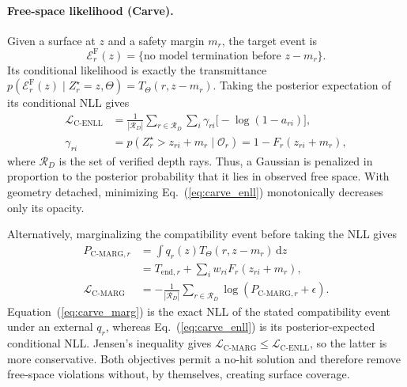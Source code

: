 \paragraph{Free-space likelihood (Carve).}
Given a surface at $z$ and a safety margin $m_r$, the target event is
\begin{equation}\label{eq:carve_event}
  \mathcal E_r^{\mathrm F}(z)
  =\{\text{no model termination before }z-m_r\}.
\end{equation}
Its conditional likelihood is exactly the transmittance
$p(\mathcal E_r^{\mathrm F}(z)\mid Z_r^\star=z,\Theta)
=T_\Theta(r,z-m_r)$. Taking the posterior expectation of its conditional NLL
gives
\begin{align}
  \mathcal L_{\mathrm{C\text{-}ENLL}}
  &=\frac{1}{|\mathcal R_D|}\sum_{r\in\mathcal R_D}\sum_i
    \gamma_{ri}\big[-\log(1-a_{ri})\big], \label{eq:carve_enll}\\
  \gamma_{ri}
  &=p(Z_r^\star>z_{ri}+m_r\mid\mathcal O_r)
    =1-F_r(z_{ri}+m_r), \nonumber
\end{align}
where $\mathcal R_D$ is the set of verified depth rays. Thus, a Gaussian is
penalized in proportion to the posterior probability that it lies in observed
free space. With geometry detached, minimizing Eq.~(\ref{eq:carve_enll})
monotonically decreases only its opacity.

Alternatively, marginalizing the compatibility event before taking the NLL
gives
\begin{align}
  P_{\mathrm{C\text{-}MARG},r}
  &=\int q_r(z)T_\Theta(r,z-m_r)\,\mathrm dz \nonumber\\
  &=T_{\mathrm{end},r}+\sum_iw_{ri}F_r(z_{ri}+m_r), \label{eq:carve_marg}\\
  \mathcal L_{\mathrm{C\text{-}MARG}}
  &=-\frac{1}{|\mathcal R_D|}\sum_{r\in\mathcal R_D}
  \log(P_{\mathrm{C\text{-}MARG},r}+\epsilon). \nonumber
\end{align}
Equation~(\ref{eq:carve_marg}) is the exact NLL of the stated compatibility
event under an external $q_r$, whereas Eq.~(\ref{eq:carve_enll}) is its
posterior-expected conditional NLL. Jensen's inequality gives
$\mathcal L_{\mathrm{C\text{-}MARG}}
\leq\mathcal L_{\mathrm{C\text{-}ENLL}}$, so the latter is more conservative.
Both objectives permit a no-hit solution and therefore remove free-space
violations without, by themselves, creating surface coverage.

